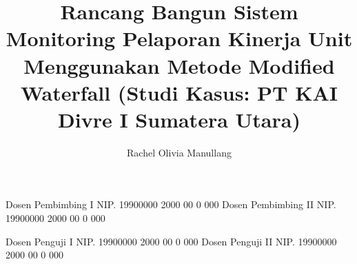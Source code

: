 \documentclass[article]{report} %
\begin{document}
    
    \title{Rancang Bangun Sistem Monitoring Pelaporan Kinerja Unit Menggunakan Metode Modified Waterfall (Studi Kasus: PT KAI Divre I Sumatera Utara)}
    \newcommand{\coverTitle}{Rancang Bangun Sistem Monitoring Pelaporan Kinerja Unit Menggunakan Metode Modified Waterfall\\[0.15\baselineskip](Studi Kasus: PT KAI Divre I Sumatera Utara)}

	\author{Rachel Olivia Manullang}	%
	
	\dosbingA%
		{Dosen Pembimbing I}%
		{NIP. 19900000 2000 00 0 000}	%
	\dosbingB%
		{Dosen Pembimbing II}%
		{NIP. 19900000 2000 00 0 000}	%
		
	\pengujiA%
		{Dosen Penguji I}%
		{NIP. 19900000 2000 00 0 000}	%
	\pengujiB%
		{Dosen Penguji II}%
		{NIP. 19900000 2000 00 0 000}	%

	\sloppy %
    \setcounter{page}{1} %
\end{document}
